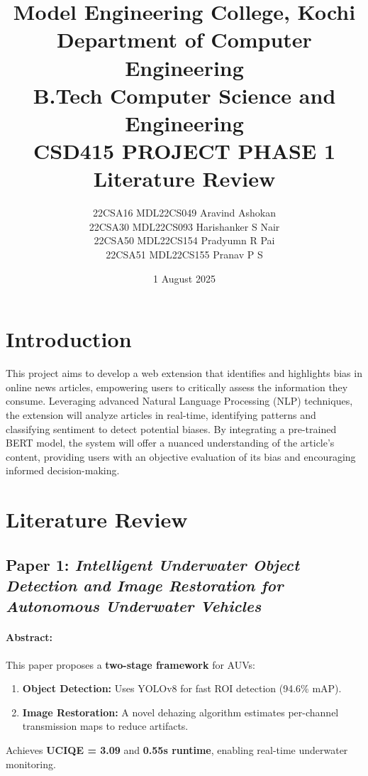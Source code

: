 \documentclass{article}
\begin{document}
\sloppy

\title{Model Engineering College, Kochi\\
    Department of Computer Engineering\\
    B.Tech Computer Science and Engineering\\
    CSD415 PROJECT PHASE 1\\
    \textbf{Literature Review}\\
}

\author{
    22CSA16 MDL22CS049 Aravind Ashokan\\
    22CSA30 MDL22CS093 Harishanker S Nair\\
    22CSA50 MDL22CS154 Pradyumn R Pai\\
    22CSA51 MDL22CS155 Pranav P S\\
}
\date{1 August 2025}
\maketitle

\section{Introduction}
This project aims to develop a web extension that identifies and highlights bias in online news articles, empowering users to critically assess the information they consume. Leveraging advanced Natural Language Processing (NLP) techniques, the extension will analyze articles in real-time, identifying patterns and classifying sentiment to detect potential biases. By integrating a pre-trained BERT model, the system will offer a nuanced understanding of the article's content, providing users with an objective evaluation of its bias and encouraging informed decision-making.

\section{Literature Review}

\subsection{Paper 1: \textit{Intelligent Underwater Object Detection and Image Restoration for Autonomous Underwater Vehicles\cite{Fayaz_2023}}}

\paragraph{Abstract:}
This paper proposes a \textbf{two-stage framework} for AUVs:
\begin{enumerate}
    \item \textbf{Object Detection:} Uses YOLOv8 for fast ROI detection (94.6\% mAP).
    \item \textbf{Image Restoration:} A novel dehazing algorithm estimates per-channel transmission maps to reduce artifacts.
\end{enumerate}
Achieves \textbf{UCIQE = 3.09} and \textbf{0.55s runtime}, enabling real-time underwater monitoring.
\end{document}

